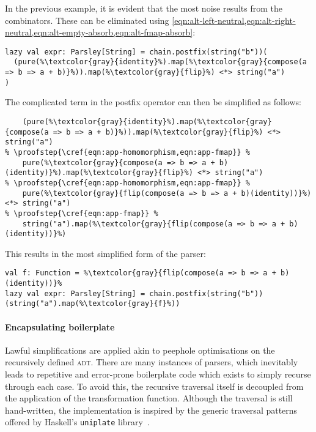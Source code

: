 \documentclass[../../../main.tex]{subfiles}
\begin{document}
In the previous example, it is evident that the most noise results from the  combinators.
These can be eliminated using \cref{eqn:alt-left-neutral,eqn:alt-right-neutral,eqn:alt-empty-absorb,eqn:alt-fmap-absorb}:
\begin{verbatim}
lazy val expr: Parsley[String] = chain.postfix(string("b"))(
  (pure(%\textcolor{gray}{identity}%).map(%\textcolor{gray}{compose(a => b => a + b)}%)).map(%\textcolor{gray}{flip}%) <*> string("a")
)
\end{verbatim}
%
The complicated term in the postfix operator can then be simplified as follows:
\begin{verbatim}
    (pure(%\textcolor{gray}{identity}%).map(%\textcolor{gray}{compose(a => b => a + b)}%)).map(%\textcolor{gray}{flip}%) <*> string("a")
% \proofstep{\cref{eqn:app-homomorphism,eqn:app-fmap}} %
    pure(%\textcolor{gray}{compose(a => b => a + b)(identity)}%).map(%\textcolor{gray}{flip}%) <*> string("a")
% \proofstep{\cref{eqn:app-homomorphism,eqn:app-fmap}} %
    pure(%\textcolor{gray}{flip(compose(a => b => a + b)(identity))}%) <*> string("a")
% \proofstep{\cref{eqn:app-fmap}} %
    string("a").map(%\textcolor{gray}{flip(compose(a => b => a + b)(identity))}%)
\end{verbatim}
%
This results in the most simplified form of the parser:
\begin{verbatim}
val f: Function = %\textcolor{gray}{flip(compose(a => b => a + b)(identity))}%
lazy val expr: Parsley[String] = chain.postfix(string("b"))(string("a").map(%\textcolor{gray}{f}%))
\end{verbatim}

\paragraph{Encapsulating boilerplate}
Lawful simplifications are applied akin to peephole optimisations on the recursively defined  \textsc{adt}.
There are many instances of parsers, which inevitably leads to repetitive and error-prone boilerplate code which exists to simply recurse through each case.
To avoid this, the recursive traversal itself is decoupled from the application of the transformation function.
Although the traversal is still hand-written, the implementation is inspired by the generic traversal patterns offered by Haskell's \texttt{uniplate} library~\cite{mitchell_uniform_2007}.
\end{document}
